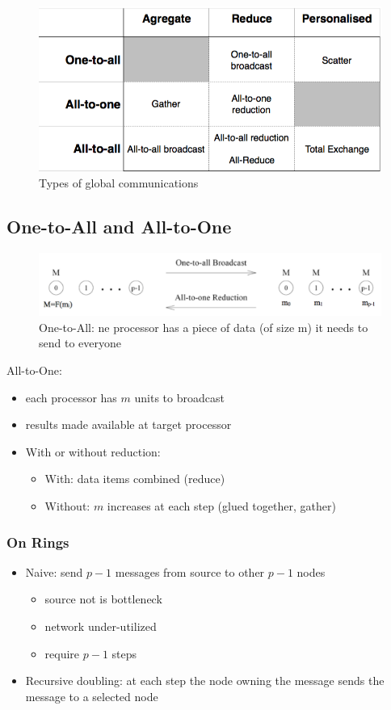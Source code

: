 \documentclass[11pt,a4paper]{report}
\begin{document}
\begin{figure}[H]
    \centering
    \includegraphics[width=0.5\linewidth]{img/comm_table}
    \caption{Types of global communications}
    \label{fig:commtable}
\end{figure}

\subsection{One-to-All and All-to-One}

\begin{figure}[H]
\centering
\includegraphics[width=0.7\linewidth]{img/comm_one-to-all}
\caption{One-to-All: ne processor has a piece of data (of size m) it needs to 
send to everyone}
\label{fig:comonetoall}
\end{figure}

All-to-One:

\begin{itemize}
    \item each processor has \(m\) units to broadcast
    \item results made available at target processor
    \item With or without reduction:
    \begin{itemize}
        \item With: data items combined (reduce)
        \item Without: \(m\) increases at each step (glued together, gather)
    \end{itemize}
\end{itemize}

\subsubsection{On Rings}

\begin{itemize}
    \item Naive: send $p-1$ messages from source to other $p-1$ nodes
    \begin{itemize}
        \item source not is bottleneck
        \item network under-utilized
        \item require $p-1$ steps
    \end{itemize}
    
    \item Recursive doubling: at each step the node owning the message sends 
    the message to a selected node
\end{itemize}
\end{document}
